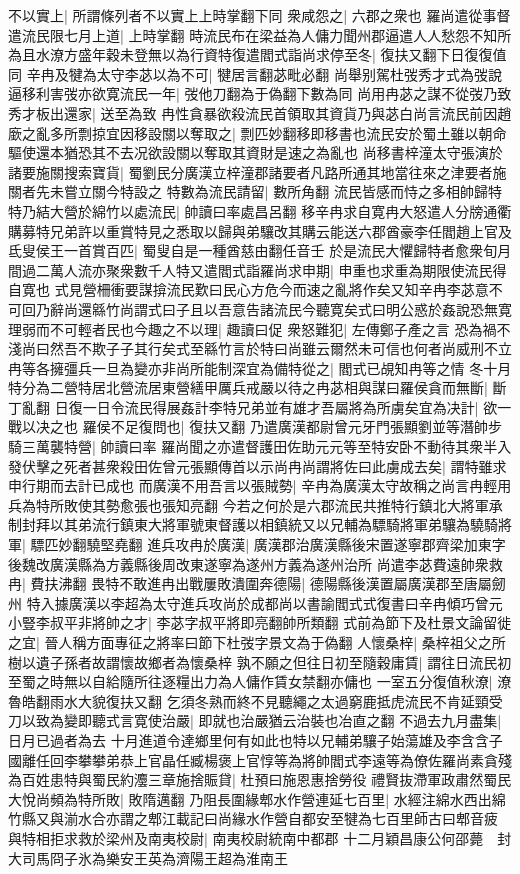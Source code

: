 不以實上|{
	所謂條列者不以實上上時掌翻下同}
衆咸怨之|{
	六郡之衆也}
羅尚遣從事督遣流民限七月上道|{
	上時掌翻}
時流民布在梁益為人傭力聞州郡逼遣人人愁怨不知所為且水潦方盛年穀未登無以為行資特復遣閻式詣尚求停至冬|{
	復扶又翻下日復復值同}
辛冉及犍為太守李苾以為不可|{
	犍居言翻苾毗必翻}
尚舉别駕杜弢秀才式為弢說逼移利害弢亦欲寛流民一年|{
	弢他刀翻為于偽翻下數為同}
尚用冉苾之謀不從弢乃致秀才板出還家|{
	送至為致}
冉性貪暴欲殺流民首領取其資貨乃與苾白尚言流民前因趙廞之亂多所剽掠宜因移設關以奪取之|{
	剽匹妙翻移即移書也流民安於蜀土雖以朝命驅使還本猶恐其不去况欲設關以奪取其資財是速之為亂也}
尚移書梓潼太守張演於諸要施關搜索寶貨|{
	蜀劉民分廣漢立梓潼郡諸要者凡路所通其地當往來之津要者施關者先未嘗立關今特設之}
特數為流民請留|{
	數所角翻}
流民皆感而恃之多相帥歸特特乃結大營於綿竹以處流民|{
	帥讀曰率處昌呂翻}
移辛冉求自寛冉大怒遣人分牓通衢購募特兄弟許以重賞特見之悉取以歸與弟驤改其購云能送六郡酋豪李任閻趙上官及氐叟侯王一首賞百匹|{
	蜀叟自是一種酋慈由翻任音壬}
於是流民大懼歸特者愈衆旬月間過二萬人流亦聚衆數千人特又遣閻式詣羅尚求申期|{
	申重也求重為期限使流民得自寛也}
式見營柵衝要謀揜流民歎曰民心方危今而速之亂將作矣又知辛冉李苾意不可回乃辭尚還緜竹尚謂式曰子且以吾意告諸流民今聽寛矣式曰明公惑於姦說恐無寛理弱而不可輕者民也今趣之不以理|{
	趣讀曰促}
衆怒難犯|{
	左傳鄭子產之言}
恐為禍不淺尚曰然吾不欺子子其行矣式至緜竹言於特曰尚雖云爾然未可信也何者尚威刑不立冉等各擁彊兵一旦為變亦非尚所能制深宜為備特從之|{
	閻式已覘知冉等之情}
冬十月特分為二營特居北營流居東營繕甲厲兵戒嚴以待之冉苾相與謀曰羅侯貪而無斷|{
	斷丁亂翻}
日復一日令流民得展姦計李特兄弟並有雄才吾屬將為所虜矣宜為决計|{
	欲一戰以决之也}
羅侯不足復問也|{
	復扶又翻}
乃遣廣漢都尉曾元牙門張顯劉並等潛帥步騎三萬襲特營|{
	帥讀曰率}
羅尚聞之亦遣督護田佐助元元等至特安卧不動待其衆半入發伏擊之死者甚衆殺田佐曾元張顯傳首以示尚冉尚謂將佐曰此虜成去矣|{
	謂特雖求申行期而去計已成也}
而廣漢不用吾言以張賊勢|{
	辛冉為廣漢太守故稱之尚言冉輕用兵為特所敗使其勢愈張也張知亮翻}
今若之何於是六郡流民共推特行鎮北大將軍承制封拜以其弟流行鎮東大將軍號東督護以相鎮統又以兄輔為驃騎將軍弟驤為驍騎將軍|{
	驃匹妙翻驍堅堯翻}
進兵攻冉於廣漢|{
	廣漢郡治廣漢縣後宋置遂寧郡齊梁加東字後魏改廣漢縣為方義縣後周改東遂寧為遂州方義為遂州治所}
尚遣李苾費遠帥衆救冉|{
	費扶沸翻}
畏特不敢進冉出戰屢敗潰圍奔德陽|{
	德陽縣後漢置屬廣漢郡至唐屬劒州}
特入據廣漢以李超為太守進兵攻尚於成都尚以書諭閻式式復書曰辛冉傾巧曾元小豎李叔平非將帥之才|{
	李苾字叔平將即亮翻帥所類翻}
式前為節下及杜景文論留徙之宜|{
	晉人稱方面專征之將率曰節下杜弢字景文為于偽翻}
人懷桑梓|{
	桑梓祖父之所樹以遺子孫者故謂懷故鄉者為懷桑梓}
孰不願之但往日初至隨穀庸賃|{
	謂往日流民初至蜀之時無以自給隨所往逐糧出力為人傭作賃女禁翻亦傭也}
一室五分復值秋潦|{
	潦魯皓翻雨水大貌復扶又翻}
乞須冬熟而終不見聽繩之太過窮鹿抵虎流民不肯延頸受刀以致為變即聽式言寛使治嚴|{
	即就也治嚴猶云治裝也冶直之翻}
不過去九月盡集|{
	日月已過者為去}
十月進道令達鄉里何有如此也特以兄輔弟驤子始蕩雄及李含含子國離任回李攀攀弟恭上官晶任臧楊褒上官惇等為將帥閻式李遠等為僚佐羅尚素貪殘為百姓患特與蜀民約灋三章施捨賑貸|{
	杜預曰施恩惠捨勞役}
禮賢抜滯軍政肅然蜀民大悅尚頻為特所敗|{
	敗隋邁翻}
乃阻長圍緣郫水作營連延七百里|{
	水經注綿水西出綿竹縣又與湔水合亦謂之郫江載記曰尚緣水作營自都安至犍為七百里師古曰郫音疲}
與特相拒求救於梁州及南夷校尉|{
	南夷校尉統南中都郡}
十二月穎昌康公何邵薨　封大司馬冏子氷為樂安王英為濟陽王超為淮南王

